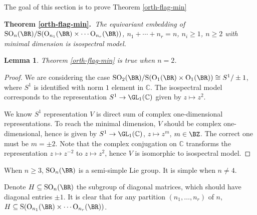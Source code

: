 \documentclass[a4paper]{amsart}
\newcommand{\BC}{{\mathbb {C}}} \newcommand{\BD}{{\mathbb {D}}}
\newcommand{\RM}{{\mathrm {M}}} \newcommand{\RN}{{\mathrm {N}}}
\newcommand{\RO}{{\mathrm {O}}} \newcommand{\RP}{{\mathrm {P}}}
\newcommand{\RS}{{\mathrm {S}}} \newcommand{\RT}{{\mathrm {T}}}
\newcommand{\SO}{{\mathrm{SO}}}\newcommand{\so}{\mathfrak{so}}
\newcommand{\tr}{{\mathrm{tr}}}\newcommand{\tor}{{\mathrm{tor}}}
\theoremstyle{plain}
\newtheorem{lem}[thm]{Lemma}
\theoremstyle{remark} \newtheorem{remark}[thm]{Remark}
\theoremstyle{remark} \newtheorem{exercise}{Exercise}
\theoremstyle{remark} \newtheorem{example}{Example}
\numberwithin{equation}{section}
\begin{document}

The goal of this section is to prove Theorem \ref{orth-flag-min}

\noindent\textbf{Theorem \ref{orth-flag-min}.}{\it \,
    The equivariant embedding of $\SO_n(\BR)/\RS(\RO_{n_1}(\BR)\times\cdots\RO_{n_r}(\BR))$, $n_1+\cdots+n_r=n$, $n_i\geqslant 1$, $n\geqslant 2$ with minimal dimension is isospectral model.}

\begin{lem}\label{orth-flag1}
    Theorem \ref{orth-flag-min} is true when $n=2$.
\end{lem}
\begin{proof}
    We are considering the case $\SO_2(\BR)/\RS(\RO_1(\BR)\times\RO_1(\BR))\cong S^1/\pm 1$, where $S^1$ is identified with norm $1$ element in $\BC$. The isospectral model corresponds to the representation $S^1\to\GL_1(\BC)$ given by $z\mapsto z^2$.

    We know $S^1$ representation $V$ is direct sum of complex one-dimensional representations. To reach the minimal dimension, $V$ should be complex one-dimensional, hence is given by $S^1\to\GL_1(\BC)$, $z\mapsto z^m$, $m\in\BZ$. The correct one must be $m=\pm 2$. Note that the complex conjugation on $\BC$ transforms the representation $z\mapsto z^{-2}$ to $z\mapsto z^2$, hence $V$ is isomorphic to isospectral model.
\end{proof}

When $n\geqslant 3$, $\SO_n(\BR)$ is a semi-simple Lie group. It is simple when $n\neq 4$.

Denote $H\subseteq\SO_n(\BR)$ the subgroup of diagonal matrices, which should have diagonal entries $\pm 1$. It is clear that for any partition $(n_1,\dots,n_r)$ of $n$, $H \subseteq \RS(\RO_{n_1}(\BR)\times\cdots\RO_{n_r}(\BR))$.
\end{document}

